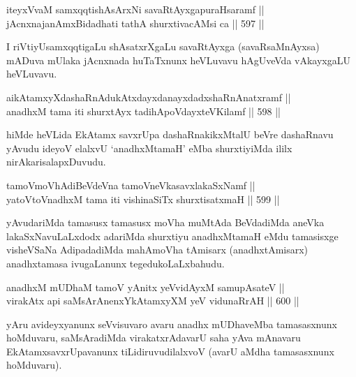 
\begin{shl}
iteyxVvaM samxqqtishAsArxNi savaRtAyxgapuraHsaramf || \\
jAcnxnajanAmxBidadhati tathA shurxtivacAMsi ca \hfill || 597 ||  
\end{shl}

\begin{artha}
I riVtiyUsamxqqtigaLu shAsatxrXgaLu savaRtAyxga (savaRsaMnAyxsa) mADuva mUlaka jAcnxnada huTaTxnunx heVLuvavu hAgUveVda vAkayxgaLU heVLuvavu.
\end{artha}

\begin{shl}
aikAtamxyXdashaRnAdukAtxdayxdanayxdadxshaRnAnatxramf || \\
anadhxM tama iti shurxtAyx tadihApoVdayxteV\s Kilamf \hfill || 598 ||  
\end{shl}

\begin{artha}
hiMde heVLida EkAtamx savxrUpa dashaRnakikxMtalU beVre dashaRnavu yAvudu ideyoV elalxvU `anadhxMtamaH' eMba shurxtiyiMda ililx nirAkarisalapxDuvudu.
\end{artha}


\begin{shl}
tamoVmoVhAdiBeVdeVna tamoV\s neVkasavxlakaSxNamf || \\
yatoV\s toV\s nadhxM tama iti vishinaSiTx shurxtisatxmaH \hfill || 599 ||  
\end{shl}

\begin{artha}
yAvudariMda tamasusx tamasusx moVha muMtAda BeVdadiMda
aneVka lakaSxNavuLaLxdodx adariMda shurxtiyu anadhxMtamaH eMdu
tamasisxge visheVSaNa AdipadadiMda mahAmoVha tAmisarx (anadhxtAmisarx)
anadhxtamasa ivugaLanunx tegedukoLaLxbahudu.
\end{artha}

\begin{shl}
anadhxM mUDhaM tamoV yAnitx yeV\s vidAyxM samupAsateV || \\
virakAtx api saMsArAnenxYkAtamxyXM yeV vidunaRrAH \hfill || 600 ||  
\end{shl}

\begin{artha}
yAru avideyxyanunx seVvisuvaro avaru anadhx mUDhaveMba tamasasxnunx hoMduvaru, saMsAradiMda virakatxrAdavarU saha yAva mAnavaru EkAtamxsavxrUpavanunx tiLidiruvudilalxvoV (avarU aMdha tamasasxnunx hoMduvaru).
\end{artha}


